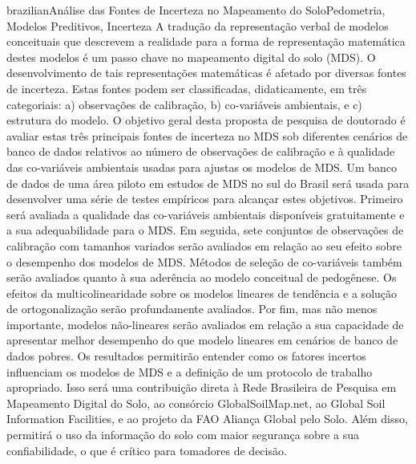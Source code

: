 \documentclass[tese,english]{UFRuralRJ}
\begin{document}
\def\tituloportugues{Análise das Fontes de Incerteza no Mapeamento do Solo}
\def\chavesportugues{Pedometria, Modelos Preditivos, Incerteza}
\generalabstracttrue
\begin{generalabstract}{brazilian}{\tituloportugues}{\chavesportugues}
A tradução da representação verbal de modelos conceituais que descrevem a 
realidade para a forma de representação matemática destes modelos é um passo 
chave no mapeamento digital do solo (MDS). O desenvolvimento de tais 
representações matemáticas é afetado por diversas fontes de incerteza. Estas 
fontes podem ser classificadas, didaticamente, em três categoriais: a) 
observações de calibração, b) co-variáveis ambientais, e c) estrutura do 
modelo. O objetivo geral desta proposta de pesquisa de doutorado é avaliar 
estas três principais fontes de incerteza no MDS sob diferentes cenários de 
banco de dados relativos ao número de observações de calibração e à qualidade 
das co-variáveis ambientais usadas para ajustas os modelos de MDS. Um banco de
dados de uma área piloto em estudos de MDS no sul do Brasil será usada para 
desenvolver uma série de testes empíricos para alcançar estes objetivos. 
Primeiro será avaliada a qualidade das co-variáveis ambientais disponíveis 
gratuitamente e a sua adequabilidade para o MDS. Em seguida, sete conjuntos 
de observações de calibração com tamanhos variados serão avaliados em relação 
ao seu efeito sobre o desempenho dos modelos de MDS. Métodos de seleção de 
co-variáveis também serão avaliados quanto à sua aderência ao modelo conceitual
de pedogênese. Os efeitos da multicolinearidade sobre os modelos lineares de 
tendência e a solução de ortogonalização serão profundamente avaliados. Por 
fim, mas não menos importante, modelos não-lineares serão avaliados em relação 
a sua capacidade de apresentar melhor desempenho do que modelo lineares em 
cenários de banco de dados pobres. Os resultados permitirão entender como os 
fatores incertos influenciam os modelos de MDS e a definição de um protocolo 
de trabalho apropriado. Isso será uma contribuição direta à Rede Brasileira de 
Pesquisa em Mapeamento Digital do Solo, ao consórcio GlobalSoilMap.net, ao 
Global Soil Information Facilities, e ao projeto da FAO Aliança Global pelo 
Solo. Além disso, permitirá o uso da informação do solo com maior segurança 
sobre a sua confiabilidade, o que é crítico para tomadores de decisão.
\end{generalabstract}
\end{document}
